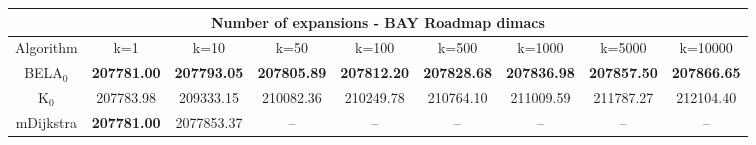 \begin{tabular}{c|cccccccc}\toprule
\multicolumn{9}{c}{Number of expansions - BAY Roadmap dimacs}\\ \midrule
Algorithm & k=1 & k=10 & k=50 & k=100 & k=500 & k=1000 & k=5000 & k=10000 \\ \midrule
BELA$_0$ & \textbf{207781.00} & \textbf{207793.05} & \textbf{207805.89} & \textbf{207812.20} & \textbf{207828.68} & \textbf{207836.98} & \textbf{207857.50} & \textbf{207866.65} \\
K$_0$ & 207783.98 & 209333.15 & 210082.36 & 210249.78 & 210764.10 & 211009.59 & 211787.27 & 212104.40 \\
mDijkstra & \textbf{207781.00} & 2077853.37 & -- & -- & -- & -- & -- & -- \\ \bottomrule 
\end{tabular}
